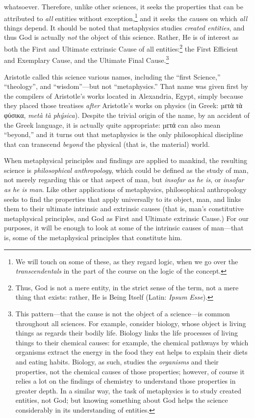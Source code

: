 \documentclass[
  12pt,
]{memoir}
\begin{document}
whatsoever. Therefore, unlike other sciences, it seeks the properties
that can be attributed to \emph{all} entities without
exception,\footnote{We will touch on some of these, as they regard
  logic, when we go over the \emph{transcendentals} in the part of the
  course on the logic of the concept.} and it seeks the causes on which
\emph{all} things depend. It should be noted that metaphysics studies
\emph{created entities}, and thus God is actually \emph{not} the object
of this science. Rather, He is of interest as both the First and
Ultimate extrinsic Cause of all entities:\footnote{Thus, God is not a
  mere entity, in the strict sense of the term, not a mere thing that
  exists: rather, He is Being Itself (Latin: \emph{Ipsum Esse}).} the
First Efficient and Exemplary Cause, and the Ultimate Final
Cause.\footnote{This pattern---that the cause is not the object of a
  science---is common throughout all sciences. For example, consider
  biology, whose object is living things as regards their bodily life.
  Biology links the life processes of living things to their chemical
  causes: for example, the chemical pathways by which organisms extract
  the energy in the food they eat helps to explain their diets and
  eating habits. Biology, as such, studies the \emph{organisms} and
  their properties, not the chemical causes of those properties;
  however, of course it relies a lot on the findings of chemistry to
  understand those properties in greater depth. In a similar way, the
  task of metaphysics is to study created entities, not God; but knowing
  something about God helps the science considerably in its
  understanding of entities.}

Aristotle called this science various names, including the ``first
Science,'' ``theology'', and ``wisdom''---but not ``metaphysics.'' That
name was given first by the compilers of Aristotle's works located in
Alexandria, Egypt, simply because they placed those treatises
\emph{after} Aristotle's works on physics (in Greek: µετὰ τὰ φύσικα,
\emph{metà tà phýsica}). Despite the trivial origin of the name, by an
accident of the Greek language, it is actually quite appropriate: µετά
can also mean ``beyond,'' and it turns out that metaphysics is the only
philosophical discipline that can transcend \emph{beyond} the physical
(that is, the material) world.

When metaphysical principles and findings are applied to mankind, the
resulting science is \emph{philosophical anthropology}, which could be
defined as the study of man, not merely regarding this or that aspect of
man, but \emph{insofar as he is}, or \emph{insofar as he is man}. Like
other applications of metaphysics, philosophical anthropology seeks to
find the properties that apply universally to its object, man, and links
them to their ultimate intrinsic and extrinsic causes (that is, man's
constitutive metaphysical principles, and God as First and Ultimate
extrinsic Cause.) For our purposes, it will be enough to look at some of
the intrinsic causes of man---that is, some of the metaphysical
principles that constitute him.
\end{document}
